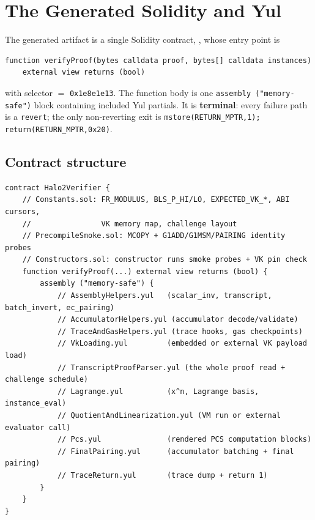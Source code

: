 \chapter{The Generated Solidity and Yul}
\label{ch:solidity}

The generated artifact is a single Solidity contract, ,
whose entry point is
\begin{lstlisting}[style=yul]
function verifyProof(bytes calldata proof, bytes[] calldata instances)
    external view returns (bool)
\end{lstlisting}
with selector  $=$ \texttt{0x1e8e1e13}. The
function body is one \texttt{assembly ("memory-safe")} block containing
included Yul partials. It is \textbf{terminal}: every failure path is a
\texttt{revert}; the only non-reverting exit is
\texttt{mstore(RETURN\_\allowbreak{}MPTR,1); return(RETURN\_\allowbreak{}MPTR,0x20)}.

\section{Contract structure}
\label{sec:sol-structure}

\begin{lstlisting}[style=plain]
contract Halo2Verifier {
    // Constants.sol: FR_MODULUS, BLS_P_HI/LO, EXPECTED_VK_*, ABI cursors,
    //                VK memory map, challenge layout
    // PrecompileSmoke.sol: MCOPY + G1ADD/G1MSM/PAIRING identity probes
    // Constructors.sol: constructor runs smoke probes + VK pin check
    function verifyProof(...) external view returns (bool) {
        assembly ("memory-safe") {
            // AssemblyHelpers.yul   (scalar_inv, transcript, batch_invert, ec_pairing)
            // AccumulatorHelpers.yul (accumulator decode/validate)
            // TraceAndGasHelpers.yul (trace hooks, gas checkpoints)
            // VkLoading.yul         (embedded or external VK payload load)
            // TranscriptProofParser.yul (the whole proof read + challenge schedule)
            // Lagrange.yul          (x^n, Lagrange basis, instance_eval)
            // QuotientAndLinearization.yul (VM run or external evaluator call)
            // Pcs.yul               (rendered PCS computation blocks)
            // FinalPairing.yul      (accumulator batching + final pairing)
            // TraceReturn.yul       (trace dump + return 1)
        }
    }
}
\end{lstlisting}

